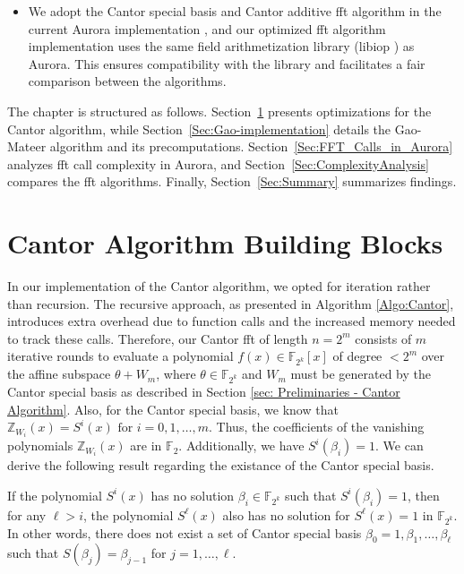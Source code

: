 \begin{itemize}
	
	\item  We adopt the Cantor special basis and Cantor additive \gls{fft} algorithm in the current Aurora implementation \cite{libiop}, and our optimized \gls{fft} algorithm implementation uses the same field arithmetization library (libiop \cite{libiop}) as Aurora. This ensures compatibility with the library and facilitates a fair comparison between the algorithms.
\end{itemize}



 The chapter is structured as follows.  Section~\ref{Sec:Cantor Implementation} presents optimizations for the Cantor algorithm, while Section~\ref{Sec:Gao-implementation} details the Gao-Mateer algorithm and its precomputations. Section~\ref{Sec:FFT_Calls_in_Aurora} analyzes \gls{fft} call complexity in Aurora, and Section~\ref{Sec:ComplexityAnalysis} compares the \gls{fft} algorithms. Finally, Section~\ref{Sec:Summary} summarizes findings.


\section{Cantor Algorithm Building Blocks}\label{Sec:Cantor Implementation}

In our implementation of the Cantor algorithm, we opted for iteration rather than recursion. The recursive approach, as presented in Algorithm \ref{Algo:Cantor}, introduces extra overhead due to function calls and the increased memory needed to track these calls. Therefore, our Cantor \gls{fft} of length $n = 2^m$ consists of $m$ iterative rounds to evaluate a polynomial $f(x)\in\mathbb{F}_{2^k}[x]$ of degree $<2^m$ over the affine subspace $\theta + W_m$, where $\theta \in \mathbb{F}_{2^k}$ and $W_m$ must be generated by the Cantor special basis as described in Section \ref{sec: Preliminaries - Cantor Algorithm}. Also, for the Cantor special basis, we know that $\mathbb{Z}_{W_{i}}(x)=S^{i}(x) \text{ for } i=0,1,\ldots,m$. Thus, the coefficients of the vanishing polynomials $\mathbb{Z}_{W_{i}}(x)$ are in $\mathbb{F}_2$. Additionally, we have $S^{i}(\beta_{i}) = 1$. We can derive the following result regarding the existance of the Cantor special basis.

\begin{theorem}
	If the polynomial $S^{i}(x)$ has no solution $\beta_{i} \in \mathbb{F}_{2^k}$ such that $S^i(\beta_i) = 1$, then for any $\ell > i$, the polynomial $S^{\ell}(x)$ also has no solution for $S^{\ell}(x) = 1$ in $\mathbb{F}_{2^k}$. In other words, there does not exist a set of Cantor special basis ${\beta_0=1, \beta_1, \ldots, \beta_{\ell}}$ such that $S(\beta_j) = \beta_{j-1}$ for $j=1,\ldots,\ell$.
 \end{theorem}


